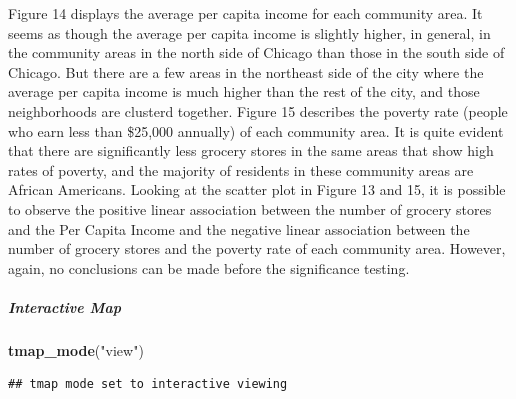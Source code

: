 \documentclass[
]{article}
\newenvironment{Shaded}{\begin{snugshade}}{\end{snugshade}}
\newcommand{\FunctionTok}[1]{\textcolor[rgb]{0.13,0.29,0.53}{\textbf{#1}}}
\newcommand{\NormalTok}[1]{#1}
\newcommand{\StringTok}[1]{\textcolor[rgb]{0.31,0.60,0.02}{#1}}
\begin{document}
Figure 14 displays the average per capita income for each community
area. It seems as though the average per capita income is slightly
higher, in general, in the community areas in the north side of Chicago
than those in the south side of Chicago. But there are a few areas in
the northeast side of the city where the average per capita income is
much higher than the rest of the city, and those neighborhoods are
clusterd together. Figure 15 describes the poverty rate (people who earn
less than \$25,000 annually) of each community area. It is quite evident
that there are significantly less grocery stores in the same areas that
show high rates of poverty, and the majority of residents in these
community areas are African Americans. Looking at the scatter plot in
Figure 13 and 15, it is possible to observe the positive linear
association between the number of grocery stores and the Per Capita
Income and the negative linear association between the number of grocery
stores and the poverty rate of each community area. However, again, no
conclusions can be made before the significance testing.

\hypertarget{interactive-map}{%
\subparagraph{Interactive Map}\label{interactive-map}}

\begin{Shaded}
\begin{Highlighting}[]
\FunctionTok{tmap\_mode}\NormalTok{(}\StringTok{"view"}\NormalTok{)}
\end{Highlighting}
\end{Shaded}

\begin{verbatim}
## tmap mode set to interactive viewing
\end{verbatim}
\end{document}
